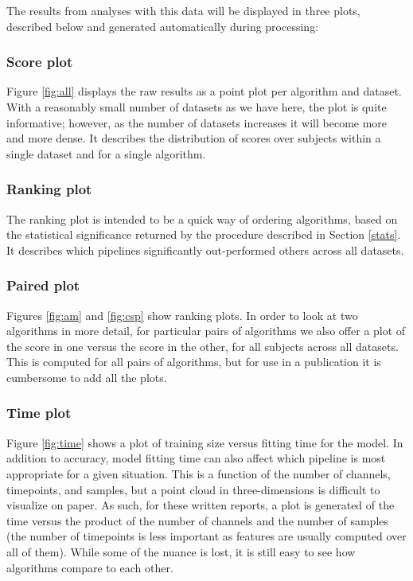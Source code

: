 The results from analyses with this data will be displayed in three
plots, described below and generated automatically during processing:

\subsubsection{Score plot}
Figure \ref{fig:all} displays the raw results as a point plot per algorithm and
dataset. With a reasonably small number of datasets as we have here, the plot is
quite informative; however, as the number of datasets increases it will become
more and more dense. It describes the distribution of scores over subjects
within a single dataset and for a single algorithm.

\subsubsection{Ranking plot}
The ranking plot is intended to be a quick way of ordering algorithms, based on
the statistical significance returned by the procedure described in Section
\ref{stats}. It describes which pipelines significantly out-performed others
across all datasets.

\subsubsection{Paired plot}
Figures \ref{fig:am} and \ref{fig:csp} show ranking plots. In order to
look at two algorithms in more detail, for particular pairs of
algorithms we also offer a plot of the score in one versus the score in the other,
for all subjects across all datasets. This is computed for all pairs
of algorithms, but for use in a publication it is cumbersome to add
all the plots.

\subsubsection{Time plot}
Figure \ref{fig:time} shows a plot of training size versus fitting
time for the model. In addition to accuracy, model fitting time can also affect which
pipeline is most appropriate for a given situation. This is a function
of the number of channels, timepoints, and samples, but a point
cloud in three-dimensions is difficult to visualize on paper. As such,
for these written reports, a plot is generated of the time versus the product of the
number of channels and the number of samples (the number of timepoints
is less important as features are usually computed over all of
them). While some of the nuance is lost, it is still easy to see how
algorithms compare to each other.

